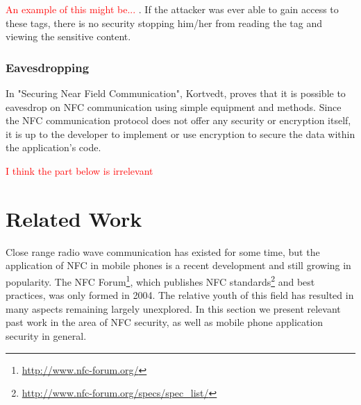 \documentclass[12pt]{article}
\newcommand\TODO[1]{\textcolor{red}{#1}}
\begin{document}
\TODO{An example of this might be... }. If the attacker was ever able to gain access to these tags, there is no security stopping him/her from reading the tag and viewing the sensitive content. 

\subsubsection{Eavesdropping}
In "Securing Near Field Communication"\cite{kortvedt2009}, Kortvedt, proves that it is possible to eavesdrop on NFC communication using simple equipment and methods. Since the NFC communication protocol does not offer any security or encryption itself, it is up to the developer to implement or use encryption to secure the data within the application's code. 

\TODO{I think the part below is irrelevant}
%


\section{Related Work}
Close range radio wave communication has existed for some time, but the application of NFC in mobile phones is a recent development and still growing in popularity.
The NFC Forum\footnote{\url{http://www.nfc-forum.org/}}, which publishes NFC standards\footnote{\url{http://www.nfc-forum.org/specs/spec_list/}} and best practices, was only formed in 2004.
The relative youth of this field has resulted in many aspects remaining largely unexplored.
In this section we present relevant past work in the area of NFC security, as well as mobile phone application security in general.
\end{document}
